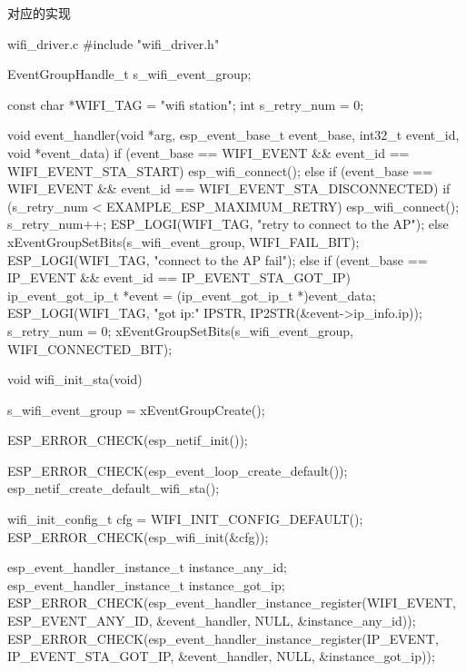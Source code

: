 \documentclass[lang=cn,newtx,10pt,scheme=chinese]{elegantbook}
\begin{document}
对应的实现

\begin{mycode}{wifi\_driver.c}
#include "wifi_driver.h"

EventGroupHandle_t s_wifi_event_group;

const char *WIFI_TAG = "wifi station";
int s_retry_num = 0;

void event_handler(void *arg, esp_event_base_t event_base,
                          int32_t event_id, void *event_data)
{
    if (event_base == WIFI_EVENT && event_id == WIFI_EVENT_STA_START)
    {
        esp_wifi_connect();
    }
    else if (event_base == WIFI_EVENT && event_id == WIFI_EVENT_STA_DISCONNECTED)
    {
        if (s_retry_num < EXAMPLE_ESP_MAXIMUM_RETRY)
        {
            esp_wifi_connect();
            s_retry_num++;
            ESP_LOGI(WIFI_TAG, "retry to connect to the AP");
        }
        else
        {
            xEventGroupSetBits(s_wifi_event_group, WIFI_FAIL_BIT);
        }
        ESP_LOGI(WIFI_TAG, "connect to the AP fail");
    }
    else if (event_base == IP_EVENT && event_id == IP_EVENT_STA_GOT_IP)
    {
        ip_event_got_ip_t *event = (ip_event_got_ip_t *)event_data;
        ESP_LOGI(WIFI_TAG, "got ip:" IPSTR, IP2STR(&event->ip_info.ip));
        s_retry_num = 0;
        xEventGroupSetBits(s_wifi_event_group, WIFI_CONNECTED_BIT);
    }
}

void wifi_init_sta(void)
{
    s_wifi_event_group = xEventGroupCreate();

    ESP_ERROR_CHECK(esp_netif_init());

    ESP_ERROR_CHECK(esp_event_loop_create_default());
    esp_netif_create_default_wifi_sta();

    wifi_init_config_t cfg = WIFI_INIT_CONFIG_DEFAULT();
    ESP_ERROR_CHECK(esp_wifi_init(&cfg));

    esp_event_handler_instance_t instance_any_id;
    esp_event_handler_instance_t instance_got_ip;
    ESP_ERROR_CHECK(esp_event_handler_instance_register(WIFI_EVENT,
                                                        ESP_EVENT_ANY_ID,
                                                        &event_handler,
                                                        NULL,
                                                        &instance_any_id));
    ESP_ERROR_CHECK(esp_event_handler_instance_register(IP_EVENT,
                                                        IP_EVENT_STA_GOT_IP,
                                                        &event_handler,
                                                        NULL,
                                                        &instance_got_ip));

}
\end{mycode}
\end{document}
